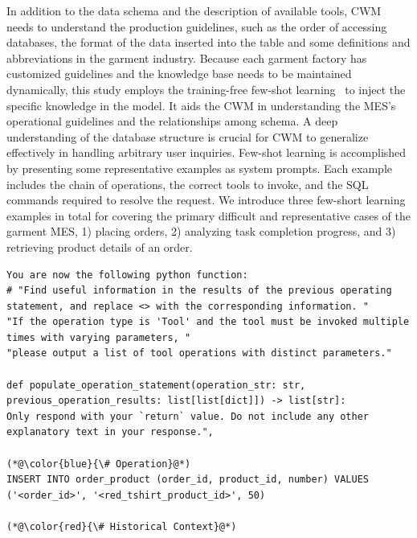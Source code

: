 \documentclass[preprint,12pt]{elsarticle}
\begin{document}
In addition to the data schema and the description of available tools, CWM needs to understand the production guidelines, such as the order of accessing databases, the format of the data inserted into the table and some definitions and abbreviations in the garment industry.
Because each garment factory has customized guidelines and the knowledge base needs to be maintained dynamically, 
this study employs the training-free few-shot learning~\cite{hu2023chatdb} to inject the specific knowledge in the model. 
It aids the CWM in understanding the MES's operational guidelines and the relationships among schema.
A deep understanding of the database structure is crucial for CWM to generalize effectively in handling arbitrary user inquiries.
Few-shot learning is accomplished by presenting some representative examples as system prompts.
Each example includes the chain of operations, the correct tools to invoke, and the SQL commands required to resolve the request.
We introduce three few-short learning examples in total for covering the primary difficult and representative cases of the garment MES, 1) placing orders, 2) analyzing task completion progress, and 3) retrieving product details of an order.


\begin{lstlisting}[style=prompt, label={lst:param_prompt},caption={Parameters Identification prompt},numberstyle=\scriptsize,aboveskip=0pt, belowskip=0pt]
You are now the following python function: 
# "Find useful information in the results of the previous operating statement, and replace <> with the corresponding information. "
"If the operation type is 'Tool' and the tool must be invoked multiple times with varying parameters, "
"please output a list of tool operations with distinct parameters."
        
def populate_operation_statement(operation_str: str, previous_operation_results: list[list[dict]]) -> list[str]:
Only respond with your `return` value. Do not include any other explanatory text in your response.",

(*@\color{blue}{\# Operation}@*)
INSERT INTO order_product (order_id, product_id, number) VALUES ('<order_id>', '<red_tshirt_product_id>', 50)

(*@\color{red}{\# Historical Context}@*)
\end{lstlisting}
\end{document}
